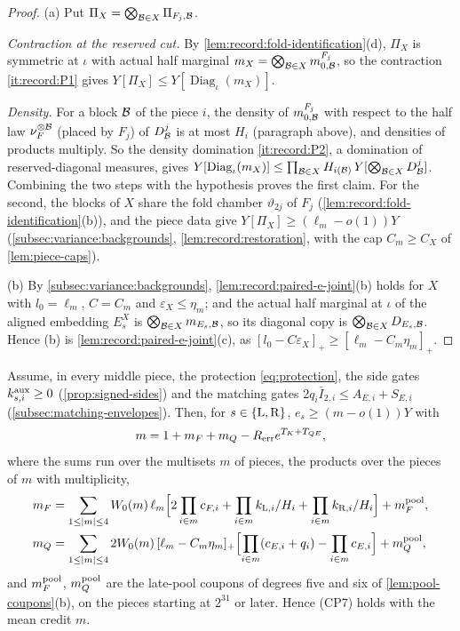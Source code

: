 \begin{proof}
(a) Put $\Pi_X=\bigotimes_{\Blk\in X}\Pi_{F_j,\Blk}$.

\emph{Contraction at the reserved cut.} By
\cref{lem:record:fold-identification}(d), $\Pi_X$ is symmetric at $\iota$
with actual half marginal $m_X=\bigotimes_{\Blk\in X}m^{F_j}_{0,\Blk}$, so
the contraction \ref{it:record:P1} gives
$Y[\Pi_X]\le Y[\operatorname{Diag}_\iota(m_X)]$.

\emph{Density.} For a block $\Blk$ of the piece $i$, the density of
$m^{F_j}_{0,\Blk}$ with respect to the half law $\nu_F^{\otimes\Blk}$ (placed by
$F_j$) of $D^j_\Blk$ is at most $H_i$ (paragraph above), and densities of
products multiply. So the density domination \ref{it:record:P2}, a domination
of reserved-diagonal measures, gives
$Y[\operatorname{Diag}_\iota(m_X)]\le\prod_{\Blk\in X}H_{i(\Blk)}\,
Y[\bigotimes_{\Blk\in X}D^j_\Blk]$. Combining the two steps with the hypothesis
proves the first claim. For the second, the blocks of $X$ share the fold chamber
$\vartheta_{2j}$ of $F_j$ (\cref{lem:record:fold-identification}(b)), and the piece
data give $Y[\Pi_X]\ge(\ell_m-o(1))Y$ (\cref{subsec:variance:backgrounds},
\cref{lem:record:restoration}, with the cap $C_m\ge C_X$ of \cref{lem:piece-caps}).

(b) By \cref{subsec:variance:backgrounds}, \cref{lem:record:paired-e-joint}(b)
holds for $X$ with $l_0=\ell_m$, $C=C_m$ and $\varepsilon_X\le\eta_m$; and the
actual half marginal at $\iota$ of the aligned embedding $E^X_s$ is
$\bigotimes_{\Blk\in X}m_{E_s,\Blk}$, so its diagonal copy is
$\bigotimes_{\Blk\in X}D_{E_s,\Blk}$. Hence (b) is \cref{lem:record:paired-e-joint}(c),
as $[l_0-C\varepsilon_X]_+\ge[\ell_m-C_m\eta_m]_+$.
\end{proof}

\begin{proposition}\label{prop:record:mean-credit}
Assume, in every middle piece, the protection \eqref{eq:protection}, the side
gates $k^{\rm aux}_{s,i}\ge0$ (\cref{prop:signed-sides}) and the matching gates
$2q_i\bar I_{2,i}\le A_{E,i}+S_{E,i}$ (\cref{subsec:matching-envelopes}). Then, for
$s\in\{{\rm L},{\rm R}\}$, $e_s\ge(m-o(1))Y$ with
\begin{equation}\label{eq:mean-credit}
 m=1+m_F+m_Q-R_{\rm err}e^{T_K+T_{QE}},
\end{equation}
where the sums run over the multisets $m$ of pieces, the products over the
pieces of $m$ with multiplicity,
\begin{align*}
 m_F&=\sum_{1\le|m|\le4}W_0(m)\,\ell_m\Bigl[2\prod_{i\in m}c_{F,i}
 +\prod_{i\in m}\frac{k_{{\rm L},i}}{H_i}+\prod_{i\in m}\frac{k_{{\rm R},i}}{H_i}\Bigr]
 +m^{\rm pool}_F,\\
 m_Q&=\sum_{1\le|m|\le4}2W_0(m)\,[\ell_m-C_m\eta_m]_+
 \Bigl[\prod_{i\in m}(c_{E,i}+q_i)-\prod_{i\in m}c_{E,i}\Bigr]+m^{\rm pool}_Q,
\end{align*}
and $m^{\rm pool}_F$, $m^{\rm pool}_Q$ are the late-pool coupons of degrees five and
six of \cref{lem:pool-coupons}(b), on the pieces starting at $2^{31}$ or later.
Hence (CP7) holds with the mean credit $m$.
\end{proposition}

